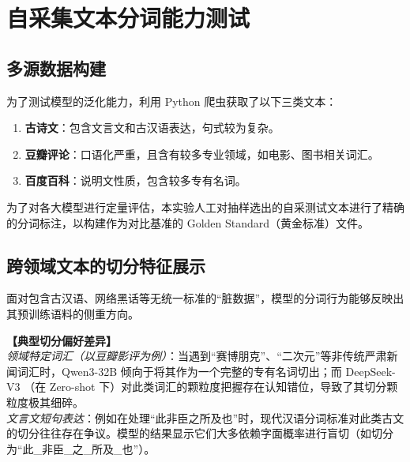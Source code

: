 \documentclass[11pt]{article}
\begin{document}
\section{自采集文本分词能力测试}
\subsection{多源数据构建}
为了测试模型的泛化能力，利用 Python 爬虫获取了以下三类文本：
\begin{enumerate}
    \item \textbf{古诗文}：包含文言文和古汉语表达，句式较为复杂。
    \item \textbf{豆瓣评论}：口语化严重，且含有较多专业领域，如电影、图书相关词汇。
    \item \textbf{百度百科}：说明文性质，包含较多专有名词。
\end{enumerate}

为了对各大模型进行定量评估，本实验人工对抽样选出的自采测试文本进行了精确的分词标注，以构建作为对比基准的 Golden Standard（黄金标准）文件。
\subsection{跨领域文本的切分特征展示}
面对包含古汉语、网络黑话等无统一标准的“脏数据”，模型的分词行为能够反映出其预训练语料的侧重方向。

\begin{mdframed}[backgroundcolor=gray!10, roundcorner=5pt]
\textbf{【典型切分偏好差异】} \\
\textit{领域特定词汇（以豆瓣影评为例）}：当遇到“赛博朋克”、“二次元”等非传统严肃新闻词汇时，Qwen3-32B 倾向于将其作为一个完整的专有名词切出；而 DeepSeek-V3 （在 Zero-shot 下）对此类词汇的颗粒度把握存在认知错位，导致了其切分颗粒度极其细碎。\\
\textit{文言文短句表达}：例如在处理“此非臣之所及也”时，现代汉语分词标准对此类古文的切分往往存在争议。模型的结果显示它们大多依赖字面概率进行盲切（如切分为“此_非臣_之_所及_也”）。
\end{mdframed}
\end{document}
